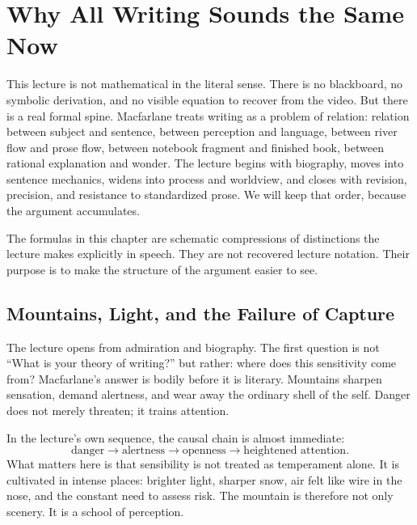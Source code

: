 \chapter{Why All Writing Sounds the Same Now}

This lecture is not mathematical in the literal sense. There is no blackboard, no symbolic derivation, and no visible equation to recover from the video. But there is a real formal spine. Macfarlane treats writing as a problem of relation: relation between subject and sentence, between perception and language, between river flow and prose flow, between notebook fragment and finished book, between rational explanation and wonder. The lecture begins with biography, moves into sentence mechanics, widens into process and worldview, and closes with revision, precision, and resistance to standardized prose. We will keep that order, because the argument accumulates.

\begin{remark}
The formulas in this chapter are schematic compressions of distinctions the lecture makes explicitly in speech. They are not recovered lecture notation. Their purpose is to make the structure of the argument easier to see.
\end{remark}

\section{Mountains, Light, and the Failure of Capture}

The lecture opens from admiration and biography. The first question is not ``What is your theory of writing?'' but rather: where does this sensitivity come from? Macfarlane's answer is bodily before it is literary. Mountains sharpen sensation, demand alertness, and wear away the ordinary shell of the self. Danger does not merely threaten; it trains attention.

In the lecture's own sequence, the causal chain is almost immediate:
\begin{equation}
\text{danger} \longrightarrow \text{alertness} \longrightarrow \text{openness} \longrightarrow \text{heightened attention}.
\end{equation}
What matters here is that sensibility is not treated as temperament alone. It is cultivated in intense places: brighter light, sharper snow, air felt like wire in the nose, and the constant need to assess risk. The mountain is therefore not only scenery. It is a school of perception.

